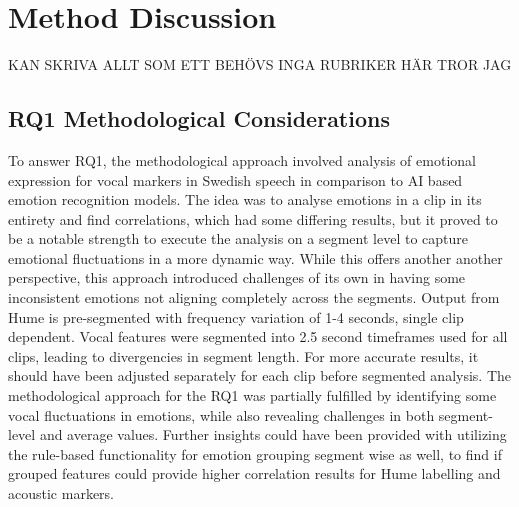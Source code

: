 \section{Method Discussion}
KAN SKRIVA ALLT SOM ETT BEHÖVS INGA RUBRIKER HÄR TROR JAG 

\medskip
\medskip

\subsection{RQ1 Methodological Considerations}
To answer RQ1, the methodological approach involved analysis of emotional expression for
vocal markers in Swedish speech in comparison to AI based emotion recognition models. The
idea was to analyse emotions in a clip in its entirety and find correlations, which had some
differing results, but it proved to be a notable strength to execute the analysis on a segment
level to capture emotional fluctuations in a more dynamic way. While this offers another
another perspective, this approach introduced challenges of its own in having some inconsistent
emotions not aligning completely across the segments. Output from Hume is pre-segmented with frequency variation of 1-4 seconds, single clip dependent. Vocal features were segmented into 2.5 second timeframes used for all clips, leading to divergencies in segment length. For more accurate results, it should have been adjusted separately for each clip before segmented analysis. The methodological approach for the RQ1 was partially fulfilled by identifying some vocal fluctuations in emotions, while also revealing challenges in both segment-level and average values. Further insights could have been provided with utilizing the rule-based functionality for emotion grouping segment wise as well, to find if grouped features could provide higher correlation results for Hume labelling and acoustic markers. 

